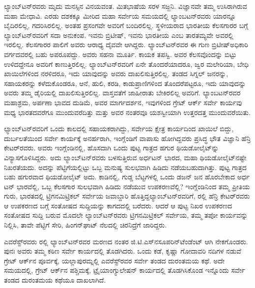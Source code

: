 ಲ್ಯಾಂಬ್​ಟನ್​ರವರು ಮೃದು ಮನಸ್ಸಿನ ವಿನಯವಂತ. ಮಿತಭಾಷೆಯ ಸರಳ ಸಜ್ಜನಿ. ವಿಜ್ಞಾನವೇ ತಮ್ಮ ಉಸಿರಾಗಿರುವ ಮಹಾ ಮೇಧಾವಿ. ಎರಡು ದಶಕಕ್ಕೂ ಮೀರಿದ ಮಹಾ ಸರ್ವೇಯ ಸಮಯದಲ್ಲಿ ಲ್ಯಾಂಬಟನ್​ರವರು ಯಾರನ್ನೂ ಬೈದಿರಲಿಲ್ಲ, ಗದರಿಸಿರಲಿಲ್ಲ. ಅಂತಹ ಪ್ರಸಂಗವೇ ಅವರಿಗೆ ಬಂದಿರಲಿಲ್ಲ. ಸ್ಥಳೀಯರಾದ ಭಾರತೀಯ ಕೆಲಸಗಾರರ ಬಗ್ಗೆ ಲ್ಯಾಂಬ್​ಟನ್​ರವರಿಗೆ ಸದಾ ಅನುಕಂಪ. ಇವನು ಬ್ರಿಟೀಷ್​, ಇವನು ಭಾರತೀಯ ಎಂಬ ತಾರತಮ್ಯವೇ ಅವರಲ್ಲಿ ಇರಲಿಲ್ಲ. ಕೆಲಸಗಾರರ ಪಾಲಿಗೆ ಅವರು ಆರಾಧ್ಯ ದೈವವೇ ಆಗಿದ್ದರು. ಲ್ಯಾಂಬ್​ಟನ್​ರವರ ಈ ಗುಣ ಬ್ರಿಟೀಷ್​ ಅಧಿಕಾರಿ ವರ್ಗದವರಲ್ಲಿ ಬಹು ಅಪರೂಪದ್ದು. ಅವರು ಸಹನಾ ಮೂರ್ತಿ. ಕಾಯಕ ತಪಸ್ವಿ. ಅವರ ಕೆಲಸವೊಂದನ್ನು ಬಿಟ್ಟು ಉಳಿದದ್ದೇನೂ ಅವರಿಗೆ ಕಾಣುತ್ತಿರಲಿಲ್ಲ. ಲ್ಯಾಂಬ್​ಟನ್​ರವರಿಗೆ ಏನೇ ತೊಂದರೆಯಾದರೂ, ಜ್ವರ ಮಲೇರಿಯಾ, ಬೇಧಿ ಖಾಯಿಲೆಗಳಿಂದ ನರಳಿದರೂ, ಇದು ಯಾವುದನ್ನು ಅವರು ದಾಖಲಿಸುತ್ತಿರಲಿಲ್ಲ. ತಂಡದ ಸಿಗ್ನಲ್​ ಜನರನ್ನು, ಸಹಾಯಕರನ್ನು ಕಳೆದುಕೊಂಡರೂ, ಆನೆ, ಹುಲಿ, ಕರಡಿ, ಕಾಡುಪ್ರಾಣಿಗಳಿಂದ ತೊಂದರೆಪಟ್ಟರೂ, ಇದು ಯಾವುದನ್ನು ಅವರು ತಮ್ಮ ಡೈರಿಯಲ್ಲಿ ದಾಖಲಿಸುತ್ತಿರಲಿಲ್ಲ. ವಾಸ್ತವತೆಗೆ ಜಾಹೀರಾತು ಬೇಕಿರಲಿಲ್ಲ ಅವರಿಗೆ. ಲ್ಯಾಂಬಟನ್​ರವರ ಮಹಾಶ್ರಮ, ಅರ್ಪಣಾ ಭಾವದ ದುಡಿಮೆ, ಅವರ ಮಾರ್ಗದರ್ಶನ, ಇವುಗಳಿಂದ ಗ್ರೇಟ್​ ಆರ್ಕ್ ಸರ್ವೇ ಕಾರ್ಯವು ಮಧ್ಯ ಭಾರತದವರೆಗೂ ಮುಂದುವರೆದಿತ್ತು ಮತ್ತು ಅವರ ನಂತರವೂ ಯಶಸ್ವೀಯಾಗಿ ಉತ್ತರದತ್ತ ಮುಂದುವರೆಯಿತು.

ಲ್ಯಾಂಬ್​ಟನ್​ರವರಿಗೆ ಒಂದು ಕಾಲದಲ್ಲಿ ಸಹಾಯಕರಾಗಿದ್ದು, ಸರ್ವೇಯ ಕ್ಷೇತ್ರ ಕಾರ್ಯದಿಂದ ಖಾಯಿಲೆ ಬಿದ್ದು, ದುರ್ಬಲತೆಯಿಂದ ಸರ್ವೇ ಕಾರ್ಯಕ್ಕೆ ಅನರ್ಹರಾಗಿ, ಇಂಗ್ಲೆಂಡಿಗೆ ವಾಪಾಸು ಹೋಗಿದ್ದವರು ಪ್ರಸಿದ್ಧ ಭೌತ ವಿಜ್ಞಾನಿ ಹೆನ್ರಿ ಕೇಟರ್​ರವರು. ಅವರು ಇಂಗ್ಲೆಂಡಿನಲ್ಲಿ, ಹೊಸದಾಗಿ ಒಂದು ಪುಟ್ಟ ಗಾತ್ರದ ಹಗುರ ಥಿಯಡೋಲೈಟ್​ನ್ನು ವಿನ್ಯಾಸಗೊಳಿಸಿದ್ದರು. ಅದು ಲ್ಯಾಂಬ್​ಟನ್​ರವರು ಬಳಸುತ್ತಿರುವ ಅರ್ಧಟನ್​ ಭಾರದ, ಮಹಾ ಥಿಯಡೋಲೈಟ್​\-ನಷ್ಟೇ ನಿಖರತೆಯದು. ಅದನ್ನು ಪೆಟ್ಟಿಗೆಯಲ್ಲಿಟ್ಟು ಒಬ್ಬ ಮನುಷ್ಯ ಸುಲಭವಾಗಿ ಹಿಡಿದು ನಡೆಯಬಹುದಾಗಿತ್ತು. ಪುಟ್ಟ ಗಾತ್ರದ ಬಹು ಹಗುರವಾದ ಥಿಯಡೋಲೈಟ್​ ಅದು. ಕಾಡಿನಲ್ಲಿ, ಗುಡ್ಡ ಬೆಟ್ಟಗಳಲ್ಲಿ ಒಂದು ಡಜನ್​ ಜನ ಹೊರಬೇಕಾದ ಅರ್ಧ ಟನ್​ ಭಾರವೆಲ್ಲಿ, ಒಬ್ಬ ಕೆಲಸಗಾರ ಸುಲಭವಾಗಿ ಹಿಡಿದು ನಡೆಯುವ ಉಪಕರಣವೆಲ್ಲಿ? ಇಂಗ್ಲೆಂಡಿನಿಂದ ತಮ್ಮ ಪ್ರೀತಿಯ ಗುರು, ಭಾರತದಲ್ಲಿ ಟ್ರಿಗನಮಿಟ್ರಿಕಲ್​ ಸರ್ವೇಯ ಜವಾಬ್ದಾರಿ ಹೊತ್ತಿದ್ದ\break ಲ್ಯಾಂಬ್​ಟನ್​ರವರಿಗೆ, ರಲ್ಲಿ ಹೆನ್ರಿ ಕೇಟರ್​ರವರು ಆ ಉಪಕರಣದ ಬಗ್ಗೆ ಸಂತೋಷದ ಸುದ್ದಿಯನ್ನು ಕಾಗದದಲ್ಲಿ ಬರೆದರು. ಆದರೆ ಆ ಪುಟ್ಟ ನಿಖರ ಉಪಕರಣದ ಸಂತೋಷದ ಸುದ್ದಿ ಬರುವ ಮೊದಲೇ ಲ್ಯಾಂಬ್​ಟನ್​ರವರು ಟ್ರಿಗನಮಿಟ್ರಿಕಲ್​ ಸರ್ವೇಯ, ತಮ್ಮ ತಪೋ ಕಾರ್ಯವನ್ನು ನಿಲ್ಲಿಸಿ, ತಾವೇ ಪೆಟ್ಟಿಗೆ ಸೇರಿ, ಹಿಂಗನ್​ಘಾಟ್​ ನೆಲದಲ್ಲಿ ಚಿರನಿದ್ರೆಗೆ ಜಾರಿದ್ದರು.

ಎವರೆಸ್ಟ್​ರವರು ರಲ್ಲಿ ಲ್ಯಾಂಬ್​ಟನ್​ರವರ ಮರಣದ ನಂತರ ಜಿ.ಟಿ.ಎಸ್​ನ\break ಸೂಪರಿನ್​ಟೆಂಡೆಂಟ್​ ಆಗಿ ನೇಕಗೊಂಡರು. ಪುನಃ ಅವರು ತಮ್ಮ ಕಠಿಣ ಸರ್ವೇ ಕಾರ್ಯದಲ್ಲಿ ತೊಡಗಿದರು. ಒಂದು ಕಡೆ, ಕೃಷ್ಣಾ ಗೋದಾವರಿ ನದಿಗಳ ನಡುವೆ ಗ್ರೇಟ್​ ಆರ್ಕ್‌ನ ಪೂರ್ವಕ್ಕೆ, ಯಲ್ಲಾಪುರಮ್ನಲ್ಲಿ ಎವರೆಸ್ಟ್​ರವರ ಸರ್ವೇ ತಂಡದ ದುರಂತಮಯ ಕಥೆ. ಅದೇ ಸಮಯದಲ್ಲಿ, ಗ್ರೇಟ್​ ಆರ್ಕ್‌ನ ಪಶ್ಚಿಮಕ್ಕೆ, ಟ್ರೈಯಾಂಗ್ಯುಲೇಷನ್​ ಕಾರ್ಯದಲ್ಲಿ ತೊಡಗಿಸಿಕೊಂಡ ಇನ್ನೊಂದು ಸರ್ವೇ ತಂಡದ ದುರಂತಮಯ ಕಥೆಯೂ ದಾಖಲಾಗಿದೆ.

